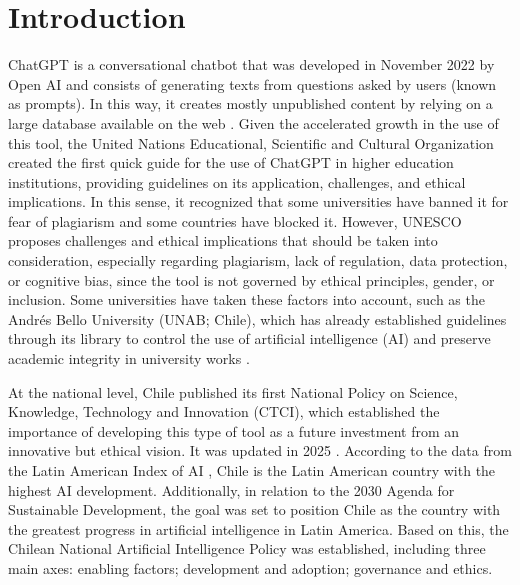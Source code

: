\documentclass[english]{textolivre}
\begin{document}
\begin{polyabstract}
\begin{portuguese}
\begin{abstract}
\end{abstract}
\end{portuguese}
\end{polyabstract}

\section{Introduction}\label{sec-intro}
ChatGPT is a conversational chatbot that was developed in November 2022 by Open AI and consists of generating texts from questions asked by users (known as prompts). In this way, it creates mostly unpublished content by relying on a large database available on the web \cite{diegoolite2023chatgpt}. Given the accelerated growth in the use of this tool, the United Nations Educational, Scientific and Cultural Organization \cite{unesco2024chatgpt} created the first quick guide for the use of ChatGPT in higher education institutions, providing guidelines on its application, challenges, and ethical implications. In this sense, it recognized that some universities have banned it for fear of plagiarism and some countries have blocked it. However, UNESCO proposes challenges and ethical implications that should be taken into consideration, especially regarding plagiarism, lack of regulation, data protection, or cognitive bias, since the tool is not governed by ethical principles, gender, or inclusion. Some universities have taken these factors into account, such as the Andrés Bello University (UNAB; Chile), which has already established guidelines through its library to control the use of artificial intelligence (AI) and preserve academic integrity in university works \cite{unab2024integridade}.

At the national level, Chile published its first National Policy on Science, Knowledge, Technology and Innovation (CTCI), which established the importance of developing this type of tool as a future investment from an innovative but ethical vision. It was updated in 2025 \cite{chile2025pnia}. According to the data from the Latin American Index of AI \cite{cenia2023ilia}, Chile is the Latin American country with the highest AI development. Additionally, in relation to the 2030 Agenda for Sustainable Development, the goal was set to position Chile as the country with the greatest progress in artificial intelligence in Latin America. Based on this, the Chilean National Artificial Intelligence Policy \cite{chile2025pnia} was established, including three main axes: enabling factors; development and adoption; governance and ethics.
\end{document}
